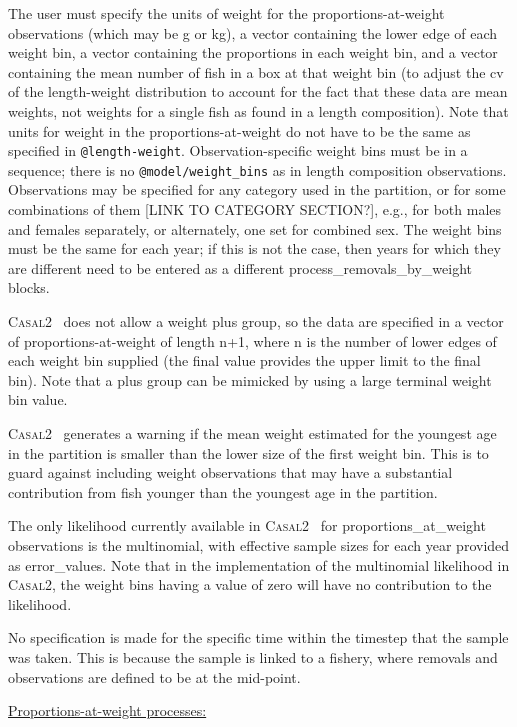 \documentclass[a4paper,11pt,twoside,pdftex,draft]{article}
\newcommand{\CNAME}{\textsc{Casal2}}
\begin{document}
The user must specify the units of weight for the proportions-at-weight observations (which may be g or kg), a vector containing the lower edge of each weight bin, a vector containing the proportions in each weight bin, and a vector containing the mean number of fish in a box at that weight bin (to adjust the cv of the length-weight distribution to account for the fact that these data are mean weights, not weights for a single fish as found in a length composition). Note that units for weight in the proportions-at-weight do not have to be the same as specified in \texttt{@length-weight}. Observation-specific weight bins must be in a sequence; there is no \texttt{@model/weight\_bins}  as in length composition observations. Observations may be specified for any category used in the partition, or for some combinations of them [LINK TO CATEGORY SECTION?], e.g., for both males and females separately, or alternately, one set for combined sex. The weight bins must be the same for each year; if this is not the case, then years for which they are different need to be entered as a different process\_removals\_by\_weight blocks.

\CNAME~ does not allow a weight plus group, so the data are specified in a vector of proportions-at-weight of length n+1, where n is the number of lower edges of each weight bin supplied (the final value provides the upper limit to the final bin). Note that a plus group can be mimicked by using a large terminal weight bin value.

\CNAME~ generates a warning if the mean weight estimated for the youngest age in the partition is smaller than the lower size of the first weight bin. This is to guard against including weight observations that may have a substantial contribution from fish younger than the youngest age in the partition.

The only likelihood currently available in \CNAME~ for proportions\_at\_weight observations is the multinomial, with effective sample sizes for each year provided as error\_values. Note that in the implementation of the multinomial likelihood in \CNAME, the weight bins having a value of zero will have no contribution to the likelihood.

No specification is made for the specific time within the timestep that the sample was taken. This is because the sample is linked to a fishery, where removals and observations are defined to be at the mid-point.

\bigskip
\underline{Proportions-at-weight processes:}
\end{document}
